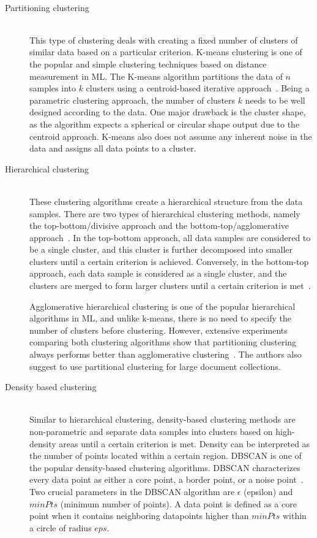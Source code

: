 \begin{description}
	
	\item []  \hfill \\ 
	\item [Partitioning clustering]  \hfill \\ 
	This type of clustering deals with creating a fixed number of clusters of similar data based on a particular criterion. K-means clustering is one of the popular and simple clustering techniques based on distance measurement in \ac{ML}. The K-means algorithm partitions the data of $n$ samples into $k$ clusters using a centroid-based iterative approach~\cite{afzali2019text}. Being a parametric clustering approach, the number of clusters $k$ needs to be well designed according to the data. One major drawback is the cluster shape, as the algorithm expects a spherical or circular shape output due to the centroid approach. K-means also does not assume any inherent noise in the data and assigns all data points to a cluster.
	
	
	\item [Hierarchical clustering]  \hfill \\ These clustering algorithms create a hierarchical structure from the data samples. There are two types of hierarchical clustering methods, namely the top-bottom/divisive approach and the bottom-top/agglomerative approach~\cite{afzali2019text}. In the top-bottom approach, all data samples are considered to be a single cluster, and this cluster is further decomposed into smaller clusters until a certain criterion is achieved. Conversely, in the bottom-top approach, each data sample is considered as a single cluster, and the clusters are merged to form larger clusters until a certain criterion is met~\cite{zhao2002comparison}.
	
	
	Agglomerative hierarchical clustering is one of the popular hierarchical algorithms in \ac{ML}, and unlike k-means, there is no need to specify the number of clusters before clustering. However, extensive experiments comparing both clustering algorithms show that partitioning clustering always performs better than agglomerative clustering~\cite{zhao2002comparison}. The authors also suggest to use partitional clustering for large document collections.

	
	\item [Density based clustering]  \hfill \\ Similar to hierarchical clustering, density-based clustering methods are non-parametric and separate data samples into clusters based on high-density areas until a certain criterion is met. Density can be interpreted as the number of points located within a certain region. \ac{DBSCAN} is one of the popular density-based clustering algorithms. \ac{DBSCAN} characterizes every data point as either a core point, a border point, or a noise point~\cite{campello2020density}. Two crucial parameters in the \ac{DBSCAN} algorithm are $\epsilon$ (epsilon) and $minPts$ (minimum number of points). A data point is defined as a core point when it contains neighboring datapoints higher than $minPts$ within a circle of radius $eps$.
	

\end{description}
